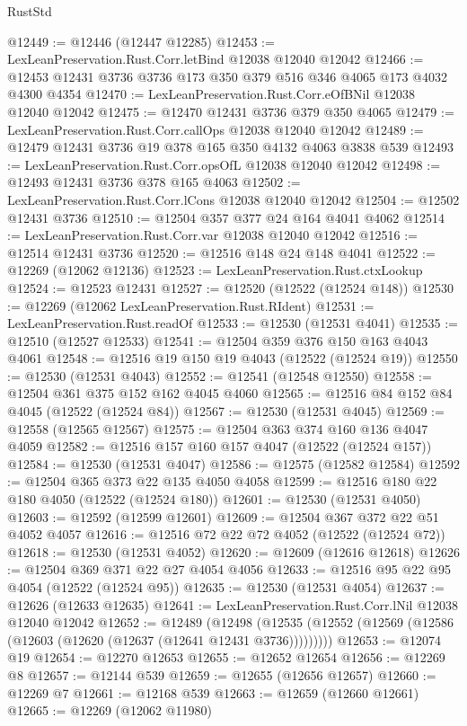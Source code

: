 \begin{lexlean}{RustStd}
\begin{coremodule}
@12449 := @12446 (@12447 @12285)
@12453 := LexLeanPreservation.Rust.Corr.letBind @12038 @12040 @12042
@12466 := @12453 @12431 @3736 @3736 @173 @350 @379 @516 @346 @4065 @173 @4032 @4300 @4354
@12470 := LexLeanPreservation.Rust.Corr.eOfBNil @12038 @12040 @12042
@12475 := @12470 @12431 @3736 @379 @350 @4065
@12479 := LexLeanPreservation.Rust.Corr.callOps @12038 @12040 @12042
@12489 := @12479 @12431 @3736 @19 @378 @165 @350 @4132 @4063 @3838 @539
@12493 := LexLeanPreservation.Rust.Corr.opsOfL @12038 @12040 @12042
@12498 := @12493 @12431 @3736 @378 @165 @4063
@12502 := LexLeanPreservation.Rust.Corr.lCons @12038 @12040 @12042
@12504 := @12502 @12431 @3736
@12510 := @12504 @357 @377 @24 @164 @4041 @4062
@12514 := LexLeanPreservation.Rust.Corr.var @12038 @12040 @12042
@12516 := @12514 @12431 @3736
@12520 := @12516 @148 @24 @148 @4041
@12522 := @12269 (@12062 @12136)
@12523 := LexLeanPreservation.Rust.ctxLookup
@12524 := @12523 @12431
@12527 := @12520 (@12522 (@12524 @148))
@12530 := @12269 (@12062 LexLeanPreservation.Rust.RIdent)
@12531 := LexLeanPreservation.Rust.readOf
@12533 := @12530 (@12531 @4041)
@12535 := @12510 (@12527 @12533)
@12541 := @12504 @359 @376 @150 @163 @4043 @4061
@12548 := @12516 @19 @150 @19 @4043 (@12522 (@12524 @19))
@12550 := @12530 (@12531 @4043)
@12552 := @12541 (@12548 @12550)
@12558 := @12504 @361 @375 @152 @162 @4045 @4060
@12565 := @12516 @84 @152 @84 @4045 (@12522 (@12524 @84))
@12567 := @12530 (@12531 @4045)
@12569 := @12558 (@12565 @12567)
@12575 := @12504 @363 @374 @160 @136 @4047 @4059
@12582 := @12516 @157 @160 @157 @4047 (@12522 (@12524 @157))
@12584 := @12530 (@12531 @4047)
@12586 := @12575 (@12582 @12584)
@12592 := @12504 @365 @373 @22 @135 @4050 @4058
@12599 := @12516 @180 @22 @180 @4050 (@12522 (@12524 @180))
@12601 := @12530 (@12531 @4050)
@12603 := @12592 (@12599 @12601)
@12609 := @12504 @367 @372 @22 @51 @4052 @4057
@12616 := @12516 @72 @22 @72 @4052 (@12522 (@12524 @72))
@12618 := @12530 (@12531 @4052)
@12620 := @12609 (@12616 @12618)
@12626 := @12504 @369 @371 @22 @27 @4054 @4056
@12633 := @12516 @95 @22 @95 @4054 (@12522 (@12524 @95))
@12635 := @12530 (@12531 @4054)
@12637 := @12626 (@12633 @12635)
@12641 := LexLeanPreservation.Rust.Corr.lNil @12038 @12040 @12042
@12652 := @12489
    (@12498 (@12535 (@12552 (@12569 (@12586 (@12603 (@12620 (@12637 (@12641 @12431 @3736)))))))))
@12653 := @12074 @19
@12654 := @12270 @12653
@12655 := @12652 @12654
@12656 := @12269 @8
@12657 := @12144 @539
@12659 := @12655 (@12656 @12657)
@12660 := @12269 @7
@12661 := @12168 @539
@12663 := @12659 (@12660 @12661)
@12665 := @12269 (@12062 @11980)

\end{coremodule}
\end{lexlean}
